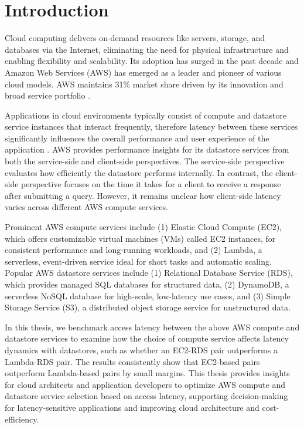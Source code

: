 \section{Introduction}
\label{cha:intro}

Cloud computing delivers on-demand resources like servers, storage, and databases via the Internet, eliminating the need for physical infrastructure and enabling flexibility and scalability. Its adoption has surged in the past decade and Amazon Web Services (AWS) has emerged as a leader and pioneer of various cloud models. AWS maintains 31\% market share driven by its innovation and broad service portfolio \cite{web_richter_cloud_market}.

Applications in cloud environments typically consist of compute and datastore service instances that interact frequently, therefore latency between these services significantly influences the overall performance and user experience of the application \cite{atricle_dean_tail,book_popescu_netlat}. AWS provides performance insights for its datastore services from both the service-side and client-side perspectives. The service-side perspective evaluates how efficiently the datastore performs internally. In contrast, the client-side perspective focuses on the time it takes for a client to receive a response after submitting a query. However, it remains unclear how client-side latency varies across different AWS compute services.

Prominent AWS compute services include (1) Elastic Cloud Compute (EC2), which offers customizable virtual machines (VMs) called EC2 instances, for consistent performance and long-running workloads, and (2) Lambda, a serverless, event-driven service ideal for short tasks and automatic scaling. Popular AWS datastore services include (1) Relational Database Service (RDS), which provides managed SQL databases for structured data, (2) DynamoDB, a serverless NoSQL database for high-scale, low-latency use cases, and (3) Simple Storage Service (S3), a distributed object storage service for unstructured data.

In this thesis, we benchmark access latency between the above AWS compute and datastore services to examine how the choice of compute service affects latency dynamics with datastores, such as whether an EC2-RDS pair outperforms a Lambda-RDS pair. The results consistently show that EC2-based pairs outperform Lambda-based pairs by small margins. This thesis provides insights for cloud architects and application developers to optimize AWS compute and datastore service selection based on access latency, supporting decision-making for latency-sensitive applications and improving cloud architecture and cost-efficiency.

